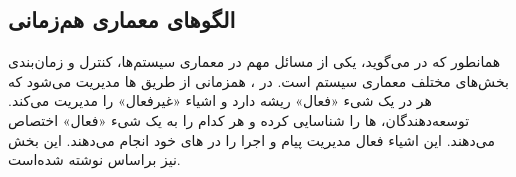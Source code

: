 \subsection{الگوهای معماری هم‌زمانی}
\begin{RTL}
همانطور که  در \cite{ref4} می‌گوید، یکی از مسائل
مهم در معماری سیستم‌ها، کنترل و زمان‌بندی بخش‌های مختلف معماری سیستم است.
در ، همزمانی از طریق ها مدیریت می‌شود که هر 
در یک شیء «فعال» ریشه دارد و اشیاء «غیرفعال» را مدیریت می‌کند.
توسعه‌دهندگان، ها را شناسایی کرده
و هر کدام را به یک شیء «فعال» اختصاص می‌دهند. این اشیاء فعال
مدیریت پیام و اجرا را در های خود انجام می‌دهند.
این بخش نیز براساس \cite{ref4} نوشته شده‌است.
\end{RTL}







